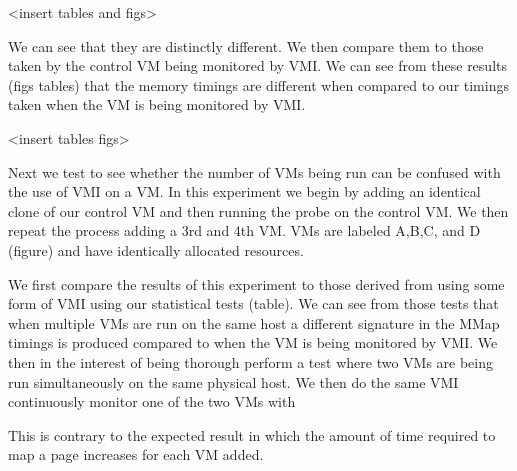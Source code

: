 <insert tables and figs>


We can see that they are distinctly different. We then compare them to those taken by the control VM being monitored by VMI. We can see from these results (figs tables) that the memory timings are different when compared to our timings taken when the VM is being monitored by VMI.

<insert tables figs> 


Next we test to see whether the number of VMs being run can be confused with the use of VMI on a VM. In this experiment we begin by adding an identical clone of our control VM and then running the probe on the control VM. We then repeat the process adding a 3rd and 4th VM. VMs are labeled A,B,C, and D (figure) and have identically allocated resources. 

We first compare the results of this experiment to those derived from using some form of VMI using our statistical tests (table). We can see from those tests that when multiple VMs are run on the same host a different signature in the MMap timings is produced compared to when the VM is being monitored by VMI.  We then in the interest of being thorough perform a test where two VMs are being run simultaneously on the same physical host. We then do the same VMI continuously monitor one of the two VMs with 

This is contrary to the expected result in which the amount of time required to map a page increases for each VM added. 